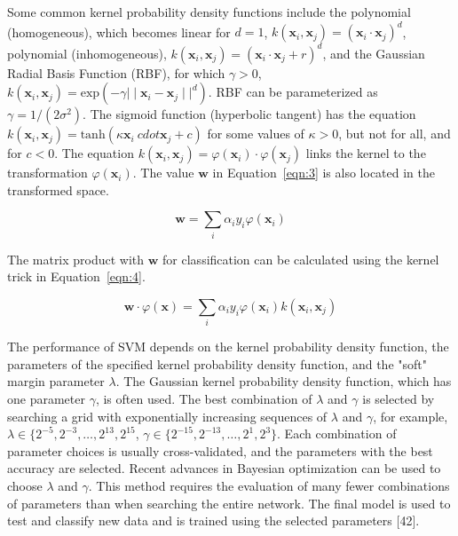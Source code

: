 \documentclass[preprint,12pt]{elsarticle}
\begin{document}
Some common kernel probability density functions include the polynomial (homogeneous), which becomes linear for $d=1$, $k(\mathbf{x}_{i}, \mathbf{x}_{j}) = {(\mathbf{x}_{i} \cdot \mathbf{x}_{j})}^{d}$, polynomial (inhomogeneous), $k(\mathbf{x}_{i}, \mathbf{x}_{j}) = {(\mathbf{x}_{i} \cdot \mathbf{x}_{j} + r)}^{d}$, and the Gaussian Radial Basis Function (RBF), for which $\gamma > 0$, $k(\mathbf{x}_{i}, \mathbf{x}_{j}) = \mathrm{exp}(- \gamma{\mid \mid \mathbf{x}_{i} - \mathbf{x}_{j} \mid \mid}^{d})$. RBF can be parameterized as $\gamma = 1 / (2{\sigma}^{2})$. The sigmoid function (hyperbolic tangent) has the equation $k(\mathbf{x}_{i}, \mathbf{x}_{j}) = \mathrm{tanh}(\kappa \mathbf{x}_{i} \ cdot \mathbf{x}_{j} + c)$ for some values of $\kappa > 0$, but not for all, and for $c < 0$. The equation $k(\mathbf{x}_{i}, \mathbf{x}_{j}) = \varphi(\mathbf{x}_{i}) \cdot \varphi(\mathbf{x}_{j})$ links the kernel to the transformation $\varphi(\mathbf{x}_{i})$. The value $\mathbf{w}$ in Equation~\ref{eqn:3} is also located in the transformed space.

\begin{equation}
	\mathbf{w} = \sum_{i} \alpha_{i}y_{i}\varphi(\mathbf{x}_{i} )
	\label{eqn:3}
\end{equation}

The matrix product with $\mathbf{w}$ for classification can be calculated using the kernel trick in Equation~\ref{eqn:4}.

\begin{equation}
	\mathbf{w} \cdot \varphi(\mathbf{x}) = \sum_{i} \alpha_{i}y_{i}\varphi (\mathbf{x}_{i}) k(\mathbf{x}_{i}, \mathbf{x}_{j})
	\label{eqn:4}
\end{equation}

The performance of SVM depends on the kernel probability density function, the parameters of the specified kernel probability density function, and the "soft" margin parameter $\lambda$. The Gaussian kernel probability density function, which has one parameter $\gamma$, is often used. The best combination of $\lambda$ and $\gamma$ is selected by searching a grid with exponentially increasing sequences of $\lambda$ and $\gamma$, for example, $\lambda \in \{2^{-5},2^{-3},\dots,2^{13},2^{15}$, $\gamma \in \{2^{-15},2^{-13},\dots,2^{1}, 2^{3}\}$. Each combination of parameter choices is usually cross-validated, and the parameters with the best accuracy are selected. Recent advances in Bayesian optimization can be used to choose $\lambda$ and $\gamma$. This method requires the evaluation of many fewer combinations of parameters than when searching the entire network. The final model is used to test and classify new data and is trained using the selected parameters [42].
\end{document}
